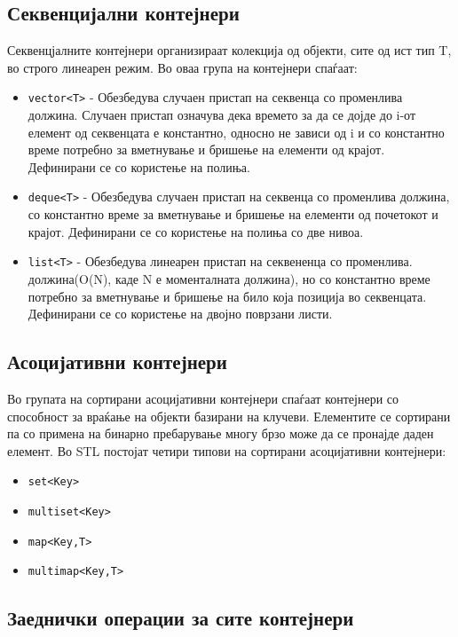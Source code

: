 \subsection{Секвенцијални контејнери}

Секвенцјалните контејнери организираат колекција од објекти, сите од ист тип T,
во строго линеарен режим. Во оваа група на контејнери спаѓаат: 

\begin{itemize}
  \item \texttt{vector<T>} - Обезбедува случаен пристап на секвенца со променлива
  должина. Случаен пристап означува дека времето за да се дојде до i-от елемент 
  од секвенцата е константно, односно не зависи од i и со константно време
  потребно за вметнување и бришење на елементи од крајот. Дефинирани се со
  користење на полиња.
  \item \texttt{deque<T>} - Обезбедува случаен пристап на секвенца со променлива должина,
  со константно време за вметнување и бришење на елементи од почетокот и крајот.
  Дефинирани се со користење на полиња со две нивоа.
  \item \texttt{list<T>} - Обезбедува линеарен пристап на секвененца со
  променлива. должина(O(N), каде N е моменталната должина), но со константно време потребно за вметнување и
бришење на било која позиција во секвенцата. Дефинирани се со користење на двојно
поврзани листи.
\end{itemize}

\subsection{Асоцијативни контејнери}

Во групата на сортирани асоцијативни контејнери спаѓаат контејнери со способност за
враќање на објекти базирани на клучеви. Елементите се сортирани па со примена на
бинарно пребарување многу брзо може да се пронајде даден елемент. Во STL постојат
четири типови на сортирани асоцијативни контејнери:
\begin{itemize}
  \item \texttt{set<Key>}
  \item \texttt{multiset<Key>}
  \item \texttt{map<Key,T>}
  \item \texttt{multimap<Key,T>}    
\end{itemize}

\subsection{Заеднички операции за сите контејнери}

